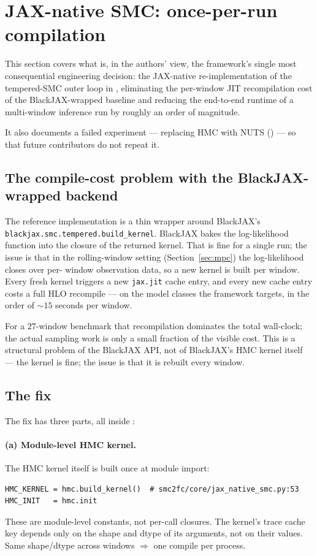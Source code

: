 \section{JAX-native SMC: once-per-run compilation} \label{sec:jax-native}

This section covers what is, in the authors' view, the framework's
single most consequential engineering decision: the JAX-native
re-implementation of the tempered-SMC outer loop in
, eliminating the per-window JIT
recompilation cost of the BlackJAX-wrapped baseline and reducing the
end-to-end runtime of a multi-window inference run by roughly an
order of magnitude.

It also documents a failed experiment --- replacing HMC with NUTS
() --- so that future
contributors do not repeat it.

\subsection{The compile-cost problem with the BlackJAX-wrapped backend}

The reference implementation  is a
thin wrapper around BlackJAX's
\texttt{blackjax.smc.tempered.build\_kernel}. BlackJAX bakes the
log-likelihood function into the closure of the returned kernel.
That is fine for a single run; the issue is that in the rolling-window
setting (Section~\ref{sec:mpc}) the log-likelihood closes over per-
window observation data, so a new kernel is built per window. Every
fresh kernel triggers a new \texttt{jax.jit} cache entry, and every
new cache entry costs a full HLO recompile --- on the model classes
the framework targets, in the order of $\sim 15$ seconds per window.

For a $27$-window benchmark that recompilation dominates the total
wall-clock; the actual sampling work is only a small fraction of the
visible cost. This is a structural problem of the BlackJAX API, not
of BlackJAX's HMC kernel itself --- the kernel is fine; the issue is
that it is rebuilt every window.

\subsection{The fix}

The fix has three parts, all inside
:

\paragraph{(a) Module-level HMC kernel.} The HMC kernel itself is
built once at module import:
\begin{lstlisting}
HMC_KERNEL = hmc.build_kernel()  # smc2fc/core/jax_native_smc.py:53
HMC_INIT   = hmc.init
\end{lstlisting}
These are module-level constants, not per-call closures. The kernel's
trace cache key depends only on the shape and dtype of its arguments,
not on their values. Same shape/dtype across windows $\Rightarrow$ one
compile per process.

